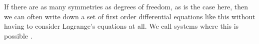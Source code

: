 \documentclass[fleqn]{NotesClass}
\begin{document}
    If there are as many symmetries as degrees of freedom, as is the case here, then we can often write down a set of first order differential equations like this without having to consider Lagrange's equations at all.
    We call systems where this is possible .
    
    \appendixpage
    \begin{appendices}
        
    \end{appendices}
    
    \backmatter
    \renewcommand{\glossaryname}{Acronyms}
    \printglossary[acronym]
    \printindex
\end{document}
